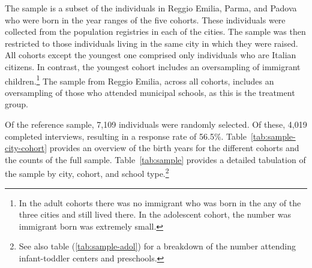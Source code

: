 \documentclass[12pt]{article}
\begin{document}
%
%

The sample is a subset of the individuals in Reggio Emilia, Parma, and Padova who were born in the year ranges of the five cohorts.  These individuals were collected from the population registries in each of the cities. The sample was then restricted to those individuals living in the same city in which they were raised. All cohorts except the youngest one comprised only individuals who are Italian citizens. In contrast, the youngest cohort includes an oversampling of immigrant children.\footnote{In the adult cohorts there was no immigrant who was born in the any of the three cities and still lived there. In the adolescent cohort, the number was immigrant born was extremely small.} The sample from Reggio Emilia, across all cohorts, includes an oversampling of those who attended municipal schools, as this is the treatment group.

Of the reference sample, 7,109 individuals were randomly selected. Of these, 4,019 completed interviews, resulting in a response rate of 56.5\%. Table~\ref{tab:sample-city-cohort} provides an overview of the birth years for the different cohorts and the counts of the full sample. Table~\ref{tab:sample} provides a detailed tabulation of the sample by city, cohort, and school type.\footnote{See also table (\ref{tab:sample-adol}) for a breakdown of the number attending infant-toddler centers and preschools.}
\end{document}
